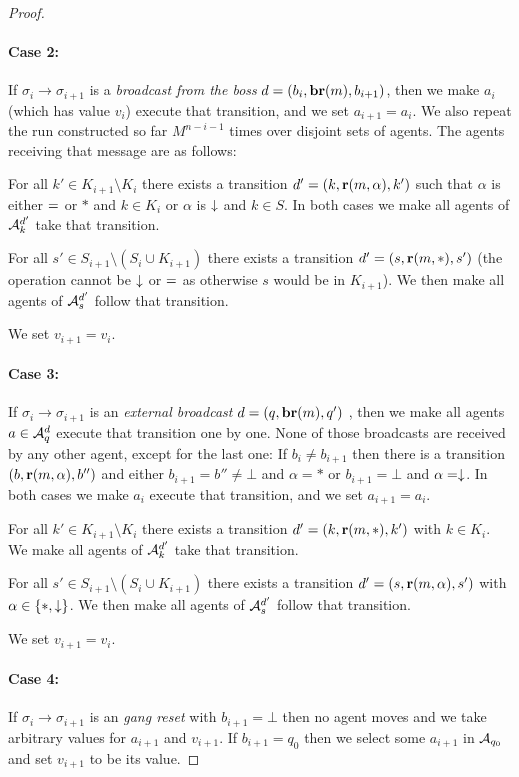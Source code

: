 \begin{proof}
\paragraph{Case 2: } If $\sigma_i \to \sigma_{i+1}$ is a \emph{broadcast from the boss} $d = (b_i, \textbf{br}(m), b_{i+1})$, then we make $a_i$ (which has value $v_i$) execute that transition, and we set $a_{i+1} = a_i$. We also repeat the run constructed so far $M^{n-i-1}$ times over disjoint sets of agents.
The agents receiving that message are as follows:

For all $k' \in K_{i+1} \setminus K_i$ there exists a transition $d'=(k, \textbf{r}(m, \alpha), k')$ such that $\alpha$ is either ${=}$ or $*$ and $k \in K_i$ or $\alpha$ is $\downarrow$ and $k\in S$.
In both cases we make all agents of $\mathcal{A}_k^{d'}$ take that transition.

For all $s' \in S_{i+1} \setminus (S_i \cup K_{i+1})$ there exists a transition $d'=(s,\textbf{r}(m, *),s')$ (the operation cannot be $\downarrow$ or ${=}$ as otherwise $s$ would be in $K_{i+1}$). We then make all agents of $\mathcal{A}_s^{d'}$ follow that transition. 

We set $v_{i+1} = v_i$.

\paragraph{Case 3: } If $\sigma_i \to \sigma_{i+1}$ is an \emph{external broadcast} $d = (q, \textbf{br}(m), q')$ , then we make all agents $a \in \mathcal{A}_q^{d}$ execute that transition one by one. None of those broadcasts are received by any other agent, except for the last one:
If $b_i \neq b_{i+1}$ then there is a transition $(b, \textbf{r}(m, \alpha), b'')$ and either $b_{i+1} = b'' \neq \bot$ and $\alpha = *$ or $b_{i+1} = \bot$ and $\alpha=\downarrow$. In both cases we make $a_i$ execute that transition, and we set $a_{i+1} = a_i$.

For all $k' \in K_{i+1} \setminus K_i$ there exists a transition $d'=(k, \textbf{r}(m, *), k')$ with $k \in K_i$. We make all agents of $\mathcal{A}_k^{d'}$ take that transition.

For all $s' \in S_{i+1} \setminus (S_i \cup K_{i+1})$ there exists a transition $d'=(s,\textbf{r}(m, \alpha),s')$ with $\alpha \in \{*, \downarrow\}$. We then make all agents of $\mathcal{A}_s^{d'}$ follow that transition. 

We set $v_{i+1} = v_i$.

\paragraph{Case 4: } If $\sigma_i \to \sigma_{i+1}$ is an \emph{gang reset} with $b_{i+1} = \bot$ then no agent moves and we take arbitrary values for $a_{i+1}$ and $v_{i+1}$. If $b_{i+1}= q_0$ then we select some $a_{i+1}$ in $\mathcal{A}_{q_0}$ and set $v_{i+1}$ to be its value.


\end{proof}
